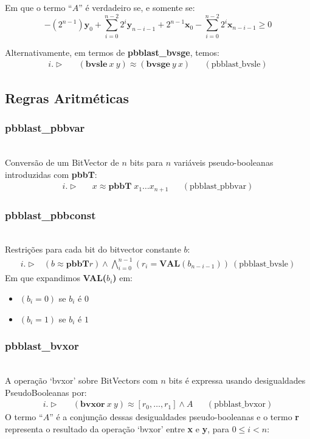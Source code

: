\documentclass[conference]{IEEEtran}
\begin{document}
Em que o termo ``$A$'' é verdadeiro se, e somente se:
\[
    -(2^{n-1})\mathbf{y}_{0} + \sum_{i=0}^{n-2} 2^i\mathbf{y}_{n-i-1} + 2^{n-1}\mathbf{x}_{0} - \sum_{i=0}^{n-2} 2^i\mathbf{x}_{n-i-1} \geq 0
\]

Alternativamente, em termos de \textbf{pbblast\_bvsge}, temos:
\begin{align*}
    i. \vartriangleright &  & (\textbf{bvsle}\ x\ y) \approx (\textbf{bvsge}\ y\ x) &  & (\text{pbblast\_bvsle})
\end{align*}

\subsection{Regras Aritméticas}
\subsubsection{\textbf{pbblast\_pbbvar}}
\noindent\\
Conversão de um BitVector de $n$ bits para $n$ variáveis pseudo-booleanas introduzidas com \textbf{pbbT}:
\begin{align*}
    i. \vartriangleright &  & x \approx \textbf{pbbT}\; x_1 \dots x_{n+1} &  & (\text{pbblast\_pbbvar})
\end{align*}

\subsubsection{\textbf{pbblast\_pbbconst}}
\noindent\\
Restrições para cada bit do bitvector constante $b$:
\begin{align*}
    i.\vartriangleright & \left(b \approx \textbf{pbbT}r\right) \land \bigwedge_{i=0}^{n-1}{\left(r_i = \textbf{VAL}(b_{n-i-1})\right)}\ (\text{pbblast\_bvsle})
\end{align*}
Em que expandimos \textbf{VAL($b_i$)} em:
\begin{itemize}
    \item $\left(b_i = 0\right)$ se $b_i$ é $0$
    \item $\left(b_i = 1\right)$ se $b_i$ é $1$
\end{itemize}

\subsubsection{\textbf{pbblast\_bvxor}}
\noindent\\
A operação `bvxor' sobre BitVectors com $n$ bits é expressa usando desigualdades PseudoBooleanas por:
\begin{align*}
    i. \vartriangleright &  & (\textbf{bvxor}\ x\ y) \approx [r_0,\dots,r_1] \land A &  & (\text{pbblast\_bvxor})
\end{align*}
O termo ``$A$'' é a conjunção dessas desigualdades pseudo-booleanas e o termo \textbf{r} representa
o resultado da operação `bvxor' entre \textbf{x} e \textbf{y}, para $0 \le i < n$:
\end{document}
